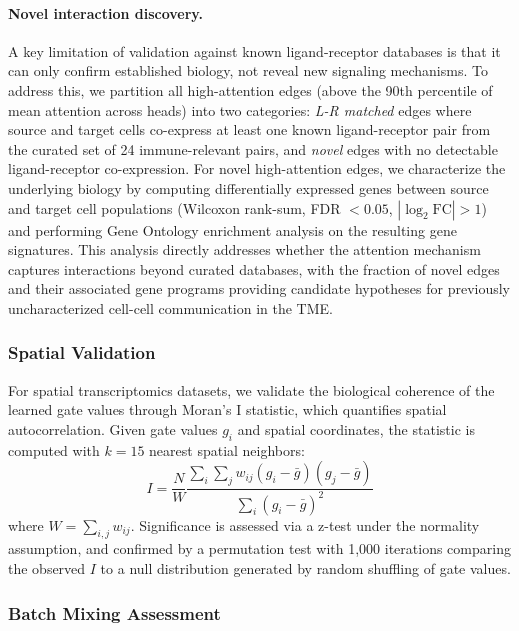 \documentclass{article}
\begin{document}
\paragraph{Novel interaction discovery.} A key limitation of validation against known ligand-receptor databases is that it can only confirm established biology, not reveal new signaling mechanisms. To address this, we partition all high-attention edges (above the 90th percentile of mean attention across heads) into two categories: \textit{L-R matched} edges where source and target cells co-express at least one known ligand-receptor pair from the curated set of 24 immune-relevant pairs, and \textit{novel} edges with no detectable ligand-receptor co-expression. For novel high-attention edges, we characterize the underlying biology by computing differentially expressed genes between source and target cell populations (Wilcoxon rank-sum, FDR $< 0.05$, $|\log_2\text{FC}| > 1$) and performing Gene Ontology enrichment analysis on the resulting gene signatures. This analysis directly addresses whether the attention mechanism captures interactions beyond curated databases, with the fraction of novel edges and their associated gene programs providing candidate hypotheses for previously uncharacterized cell-cell communication in the TME.

\subsubsection{Spatial Validation}
\label{sec:spatial_validation}

For spatial transcriptomics datasets, we validate the biological coherence of the learned gate values through Moran's I statistic, which quantifies spatial autocorrelation. Given gate values $g_i$ and spatial coordinates, the statistic is computed with $k = 15$ nearest spatial neighbors:
\begin{equation}
I = \frac{N}{W} \frac{\sum_{i} \sum_{j} w_{ij}(g_i - \bar{g})(g_j - \bar{g})}{\sum_{i}(g_i - \bar{g})^2}
\end{equation}
where $W = \sum_{i,j} w_{ij}$. Significance is assessed via a z-test under the normality assumption, and confirmed by a permutation test with 1,000 iterations comparing the observed $I$ to a null distribution generated by random shuffling of gate values.

\subsubsection{Batch Mixing Assessment}
\label{sec:batch_mixing}
\end{document}
